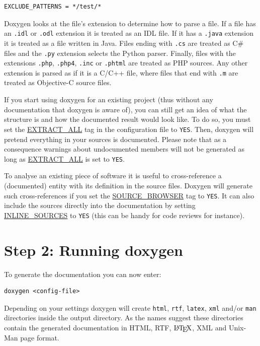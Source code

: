 \footnotesize\begin{verbatim}EXCLUDE_PATTERNS = */test/* 
\end{verbatim}
\normalsize


Doxygen looks at the file's extension to determine how to parse a file. If a file has an {\tt .idl} or {\tt .odl} extension it is treated as an IDL file. If it has a {\tt .java} extension it is treated as a file written in Java. Files ending with {\tt .cs} are treated as C\# files and the {\tt .py} extension selects the Python parser. Finally, files with the extensions {\tt .php}, {\tt .php4}, {\tt .inc} or {\tt .phtml} are treated as PHP sources. Any other extension is parsed as if it is a C/C++ file, where files that end with {\tt .m} are treated as Objective-C source files.

\label{starting_extract_all}
\hypertarget{starting_extract_all}{}
 If you start using doxygen for an existing project (thus without any documentation that doxygen is aware of), you can still get an idea of what the structure is and how the documented result would look like. To do so, you must set the \hyperlink{config_cfg_extract_all}{EXTRACT\_\-ALL} tag in the configuration file to {\tt YES}. Then, doxygen will pretend everything in your sources is documented. Please note that as a consequence warnings about undocumented members will not be generated as long as \hyperlink{config_cfg_extract_all}{EXTRACT\_\-ALL} is set to {\tt YES}.

To analyse an existing piece of software it is useful to cross-reference a (documented) entity with its definition in the source files. Doxygen will generate such cross-references if you set the \hyperlink{config_cfg_source_browser}{SOURCE\_\-BROWSER} tag to {\tt YES}. It can also include the sources directly into the documentation by setting \hyperlink{config_cfg_inline_sources}{INLINE\_\-SOURCES} to {\tt YES} (this can be handy for code reviews for instance).\hypertarget{starting_step2}{}\section{Step 2: Running doxygen}\label{starting_step2}
To generate the documentation you can now enter: 

\footnotesize\begin{verbatim}
doxygen <config-file>
\end{verbatim}
\normalsize


Depending on your settings doxygen will create {\tt html}, {\tt rtf}, {\tt latex}, {\tt xml} and/or {\tt man} directories inside the output directory. As the names suggest these directories contain the generated documentation in HTML, RTF, $\mbox{\LaTeX}$, XML and Unix-Man page format.


